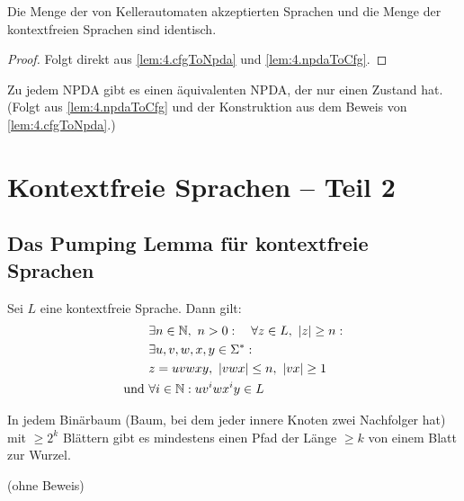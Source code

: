 \begin{Satz}
Die Menge der von Kellerautomaten akzeptierten Sprachen und die Menge der kontextfreien Sprachen sind identisch.
\end{Satz}
\begin{proof}
Folgt direkt aus \autoref{lem:4.cfgToNpda} und \autoref{lem:4.npdaToCfg}.
\end{proof}

\begin{Bemerkung}
Zu jedem \ac{NPDA} gibt es einen äquivalenten \ac{NPDA}, der nur einen Zustand hat.
(Folgt aus \autoref{lem:4.npdaToCfg} und der Konstruktion aus dem Beweis von \autoref{lem:4.cfgToNpda}.)
\end{Bemerkung}



\section{Kontextfreie Sprachen -- Teil 2}

\subsection{Das Pumping Lemma für kontextfreie Sprachen}
\begin{Satz}
\label{satz:PL für CFL}
	Sei $L$ eine kontextfreie Sprache. Dann gilt:
	        \begin{alignat*}{2}
                &\exists n\in\N,\ n>0:\quad \forall z\in L,\ |z|\geq n:\\
                &\exists u,v,w,x,y\in\Sigma^* :\\
                &z = uvwxy,\ |vwx| \leq n,\ |vx| \geq 1\\
                \text{und }& \forall i\in\N: uv^iwx^iy\in L
        \qedhere
        \end{alignat*}
\end{Satz}
\begin{lemma}\label{lemma:Binärbaum}
 In jedem Binärbaum (Baum, bei dem jeder innere Knoten zwei Nachfolger hat) mit $\geq 2^k$ Blättern gibt es mindestens einen Pfad der Länge $\geq k$ von einem Blatt zur Wurzel.
\end{lemma}
(ohne Beweis)

